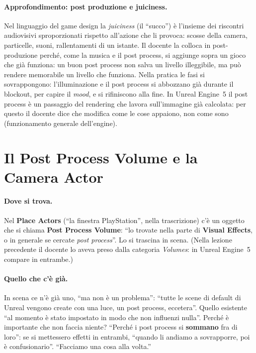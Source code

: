 \paragraph{Approfondimento: post produzione e juiciness.} Nel linguaggio del game design la
\emph{juiciness} (il ``succo'') è l'insieme dei riscontri audiovisivi sproporzionati rispetto
all'azione che li provoca: scosse della camera, particelle, suoni, rallentamenti di un
istante. Il docente la colloca in post-produzione perché, come la musica e il post process,
si aggiunge sopra un gioco che già funziona: un buon post process non salva un livello
illeggibile, ma può rendere memorabile un livello che funziona. Nella pratica le fasi si
sovrappongono: l'illuminazione e il post process si abbozzano già durante il blockout, per
capire il \emph{mood}, e si rifiniscono alla fine. In Unreal Engine~5 il post process è
un passaggio del rendering che lavora sull'immagine già calcolata: per questo il docente dice
che modifica come le cose appaiono, non come sono (funzionamento generale dell'engine).

\section{Il Post Process Volume e la Camera Actor}
\label{ue16:sec:volume}

\paragraph{Dove si trova.} Nel \textbf{Place Actors} (``la finestra PlayStation'', nella
trascrizione) c'è un oggetto che si chiama \textbf{Post Process Volume}: ``lo trovate nella
parte di \textbf{Visual Effects}, o in generale se cercate \emph{post process}''. Lo si
trascina in scena. (Nella lezione precedente il docente lo aveva preso dalla categoria
\emph{Volumes}: in Unreal Engine~5 compare in entrambe.)

\paragraph{Quello che c'è già.} In scena ce n'è già uno, ``ma non è un problema'': ``tutte le
scene di default di Unreal vengono create con una luce, un post process, eccetera''. Quello
esistente ``al momento è stato impostato in modo che non influenzi nulla''. Perché è
importante che non faccia niente? ``Perché i post process si \textbf{sommano} fra di loro'':
se si mettessero effetti in entrambi, ``quando li andiamo a sovrapporre, poi è
confusionario''. ``Facciamo una cosa alla volta.''

